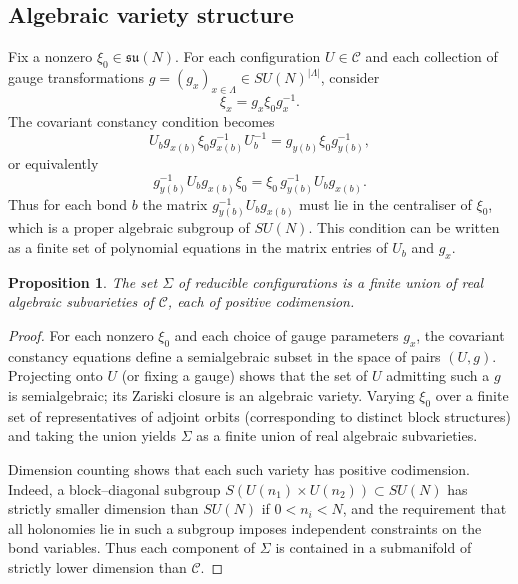 \documentclass[11pt]{article}
\newtheorem{proposition}[theorem]{Proposition}
\begin{document}
\subsection{Algebraic variety structure}

Fix a nonzero $\xi_0\in\mathfrak{su}(N)$.  For each configuration
$U\in\mathcal{C}$ and each collection of gauge transformations
$g=(g_x)_{x\in\Lambda}\in SU(N)^{|\Lambda|}$, consider
\[
  \xi_x = g_x\xi_0 g_x^{-1}.
\]
The covariant constancy condition becomes
\begin{equation}
  U_b g_{x(b)}\xi_0 g_{x(b)}^{-1} U_b^{-1}
  = g_{y(b)}\xi_0 g_{y(b)}^{-1},
\end{equation}
or equivalently
\begin{equation}
  g_{y(b)}^{-1}U_b g_{x(b)}\xi_0
  = \xi_0\,g_{y(b)}^{-1}U_b g_{x(b)}.
\end{equation}
Thus for each bond $b$ the matrix $g_{y(b)}^{-1}U_b g_{x(b)}$ must lie
in the centraliser of $\xi_0$, which is a proper algebraic subgroup of
$SU(N)$.  This condition can be written as a finite set of polynomial
equations in the matrix entries of $U_b$ and $g_x$.

\begin{proposition}
The set $\Sigma$ of reducible configurations is a finite union of real
algebraic subvarieties of $\mathcal{C}$, each of positive codimension.
\end{proposition}

\begin{proof}
For each nonzero $\xi_0$ and each choice of gauge parameters $g_x$, the
covariant constancy equations define a semialgebraic subset in the
space of pairs $(U,g)$.  Projecting onto $U$ (or fixing a gauge) shows
that the set of $U$ admitting such a $g$ is semialgebraic; its Zariski
closure is an algebraic variety.  Varying $\xi_0$ over a finite set of
representatives of adjoint orbits (corresponding to distinct block
structures) and taking the union yields $\Sigma$ as a finite union of
real algebraic subvarieties.

Dimension counting shows that each such variety has positive
codimension.  Indeed, a block--diagonal subgroup $S(U(n_1)\times
U(n_2))\subset SU(N)$ has strictly smaller dimension than $SU(N)$ if
$0<n_i<N$, and the requirement that all holonomies lie in such a
subgroup imposes independent constraints on the bond variables.  Thus
each component of $\Sigma$ is contained in a submanifold of strictly
lower dimension than $\mathcal{C}$.
\end{proof}
\end{document}
